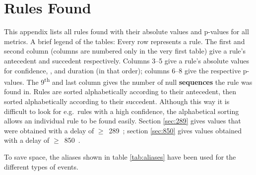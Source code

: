 
\newcommand{\tf}{\addfontfeatures{Numbers={Monospaced,Lining}}}	%
\newcommand{\ts}{~~}											%
\newcommand{\tu}[1]{\multicolumn{1}{c}{\textit{#1}}}		%

\newcommand{\mosp}{\mbox{mo\_speech}}
\newcommand{\mogain}{\mbox{mo\_gaze\_in}}
\newcommand{\mogaob}{\mbox{mo\_gaze\_obj}}
\newcommand{\mogaaw}{\mbox{mo\_gaze\_away}}
\newcommand{\mosm}{\mbox{mo\_smile}}
\newcommand{\invo}{\mbox{in\_voc}}
\newcommand{\ingamo}{\mbox{in\_gaze\_mo}}
\newcommand{\ingaob}{\mbox{in\_gaze\_obj}}
\newcommand{\ingaaw}{\mbox{in\_gaze\_away}}
\newcommand{\insm}{\mbox{in\_sm}}


\chapter{Rules Found}
\label{ch:app_rules}
This appendix lists all rules found with their absolute values and p-values for all metrics.
A brief legend of the tables: Every row represents a rule.
The first and second column (columns are numbered only in the very first table) give a rule's antecedent and succedent respectively.
Columns 3--5 give a rule's absolute values for confidence, \noc, and duration (in that order); columns 6--8 give the respective p-values.
The 9\textsuperscript{th} and last column gives the number of null \textbf{sequences} the rule was found in.
Rules are sorted alphabetically according to their antecedent, then sorted alphabetically according to their succedent.
Although this way it is difficult to look for e.g.\ rules with a high confidence, the alphabetical sorting allows an individual rule to be found easily.
Section \ref{sec:289} gives values that were obtained with a delay of \(\geq\)~289~\ms; section \ref{sec:850} gives values obtained with a delay of \(\geq\)~850~\ms.

To save space, the aliases shown in table \ref{tab:aliases} have been used for the different types of events.

